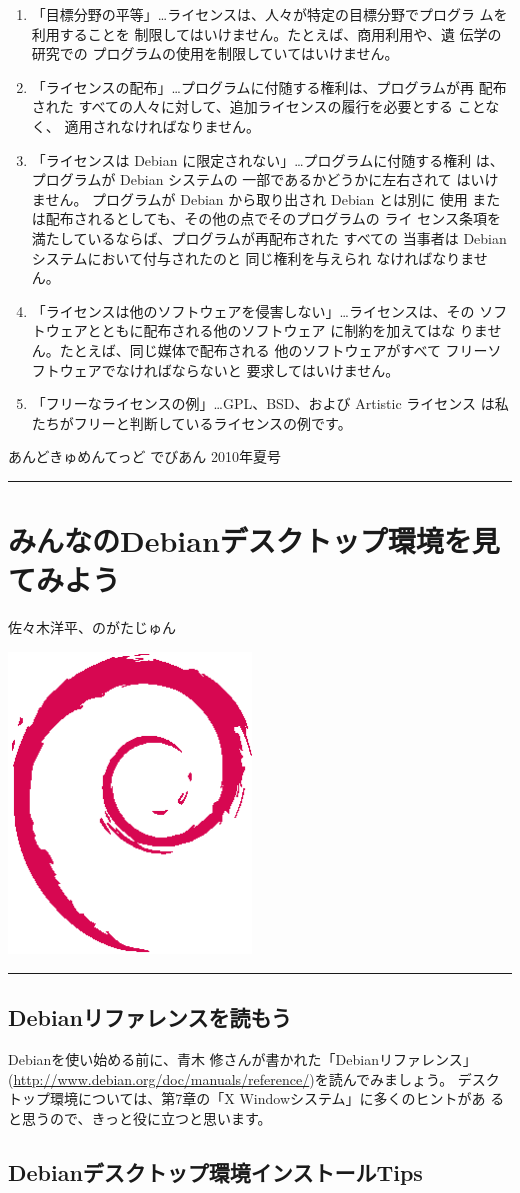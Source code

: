 \documentclass[mingoth,a4paper]{jsarticle}
\renewcommand{\dancersection}[2]{%
\newpage
あんどきゅめんてっど でびあん 2010年夏号
%
\vspace{0.1mm}\\
{\color{dancerlightblue}\rule{\hsize}{2mm}}

%
%
\begin{minipage}[t]{0.6\hsize}
\color{dancerdarkblue}
\vspace{1cm}
\section{#1}
\hfill{}#2\\
\end{minipage}
\begin{minipage}[t]{0.4\hsize}
\vspace{-2cm}
\hfill{}\includegraphics[height=8cm]{image200502/openlogo-nd.eps}\\
\vspace{-5cm}
\end{minipage}
%
%
{\color{dancerdarkblue}\rule{0.74\hsize}{2mm}}
%
\vspace{2cm}
}
\begin{document}
{\begin{enumerate}
       差別してはなりません。
 \item 「目標分野の平等」…ライセンスは、人々が特定の目標分野でプログラ
       ムを利用することを 制限してはいけません。たとえば、商用利用や、遺
       伝学の研究での プログラムの使用を制限していてはいけません。
 \item 「ライセンスの配布」…プログラムに付随する権利は、プログラムが再
       配布された すべての人々に対して、追加ライセンスの履行を必要とする
       ことなく、 適用されなければなりません。
 \item 「ライセンスは Debian に限定されない」…プログラムに付随する権利
       は、プログラムが Debian システムの 一部であるかどうかに左右されて
       はいけません。 プログラムが Debian から取り出され Debian とは別に
       使用 または配布されるとしても、その他の点でそのプログラムの ライ
       センス条項を満たしているならば、プログラムが再配布された すべての
       当事者は Debian システムにおいて付与されたのと 同じ権利を与えられ
       なければなりません。
 \item 「ライセンスは他のソフトウェアを侵害しない」…ライセンスは、その
       ソフトウェアとともに配布される他のソフトウェア に制約を加えてはな
       りません。たとえば、同じ媒体で配布される 他のソフトウェアがすべて
       フリーソフトウェアでなければならないと 要求してはいけません。
 \item 「フリーなライセンスの例」…GPL、BSD、および Artistic ライセンス
       は私たちがフリーと判断しているライセンスの例です。
\end{enumerate}
}

\dancersection{みんなのDebianデスクトップ環境を見てみよう}{佐々木洋平、のがたじゅん}

\subsection{Debianリファレンスを読もう}
Debianを使い始める前に、青木 修さんが書かれた「Debianリファレンス」
(\url{http://www.debian.org/doc/manuals/reference/})を読んでみましょう。
デスクトップ環境については、第7章の「X Windowシステム」に多くのヒントがあ
ると思うので、きっと役に立つと思います。

\subsection{Debianデスクトップ環境インストールTips}
\end{document}
